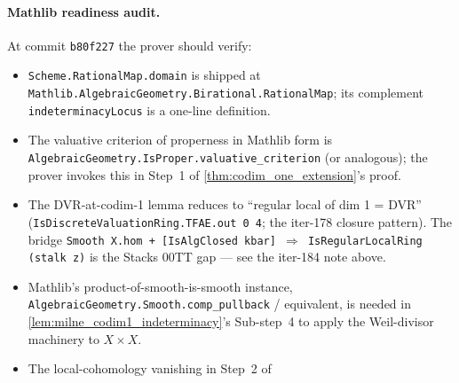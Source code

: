 \paragraph{Mathlib readiness audit.} At commit \texttt{b80f227} the prover should
verify:
\begin{itemize}
  \item \texttt{Scheme.RationalMap.domain} is shipped at
    \texttt{Mathlib.AlgebraicGeometry.Birational.RationalMap}; its complement
    \texttt{indeterminacyLocus} is a one-line definition.
  \item The valuative criterion of properness in Mathlib form is
    \texttt{AlgebraicGeometry.IsProper.valuative\_criterion} (or analogous); the
    prover invokes this in Step~1 of \cref{thm:codim_one_extension}'s proof.
  \item %
        The DVR-at-codim-1 lemma reduces to ``regular local of dim 1 = DVR''
    (\texttt{IsDiscreteValuationRing.TFAE.out 0 4}; the iter-178 closure pattern).
    The bridge \texttt{Smooth X.hom + [IsAlgClosed kbar] $\Rightarrow$
    IsRegularLocalRing (stalk z)} is the Stacks 00TT gap — see the iter-184 note above.
  \item Mathlib's product-of-smooth-is-smooth instance,
    \texttt{AlgebraicGeometry.Smooth.comp\_pullback} / equivalent, is needed in
    \cref{lem:milne_codim1_indeterminacy}'s Sub-step~4 to apply the Weil-divisor
    machinery to \(X \times X\).
  \item The local-cohomology vanishing in Step~2 of

\end{itemize}
